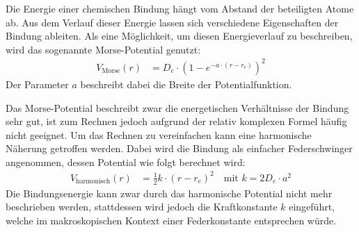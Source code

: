 \documentclass[../main.tex]{subfiles}
\begin{document}
\renewcommand{\tasktitle}{Zwischen Quant, Band und Wand} %
\renewcommand{\taskpoints}{28.5} %
\renewcommand{\taskweight}{9000}
\aufgabenanfang%

Die Energie einer chemischen Bindung hängt vom Abstand der beteiligten Atome ab. Aus dem Verlauf dieser Energie lassen sich verschiedene Eigenschaften der Bindung ableiten. Als eine Möglichkeit, um diesen Energieverlauf zu beschreiben, wird das sogenannte Morse-Potential genutzt:
\begin{align}
    V_{\text{Morse}}(r) &= D_e \cdot \left(1-e^{-a\cdot(r-r_e)}\right)^2\label{morse}
\end{align}
Der Parameter $a$ beschreibt dabei die Breite der Potentialfunktion.

Das Morse-Potential beschreibt zwar die energetischen Verhältnisse der Bindung sehr gut, ist zum Rechnen jedoch aufgrund der relativ komplexen Formel häufig nicht geeignet. Um das Rechnen zu vereinfachen kann eine harmonische Näherung getroffen werden. Dabei wird die Bindung als einfacher Federschwinger angenommen, dessen Potential wie folgt berechnet wird:
\begin{align}
    V_\text{harmonisch}(r) &= \frac{1}{2} k \cdot (r-r_e)^2\quad\text{mit }k=2D_e\cdot a^2
\end{align}
Die Bindungsenergie kann zwar durch das harmonische Potential nicht mehr beschrieben werden, stattdessen wird jedoch die Kraftkonstante \(k\) eingeführt, welche im makroskopischen Kontext einer Federkonstante entsprechen würde.

\MCvrfAnfang
{}
\MCvrfEnde
\end{document}
